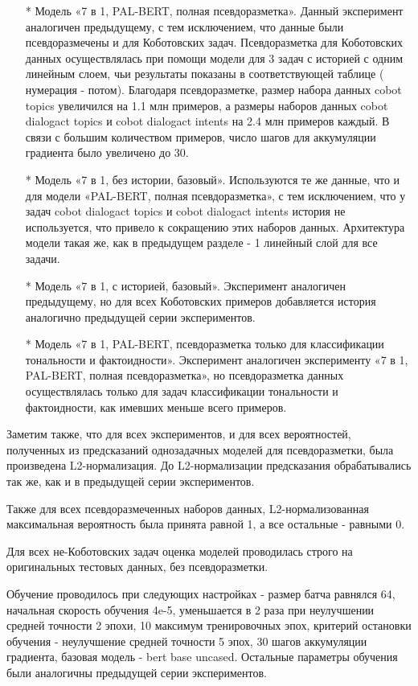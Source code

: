 \begin{itemize}
\item[*] Модель «7  в 1, PAL-BERT, полная псевдоразметка». Данный эксперимент аналогичен предыдущему, с тем исключением, что данные были псевдоразмечены и для Коботовских задач.  Псевдоразметка для Коботовских данных осуществлялась при помощи модели для 3 задач с историей с одним линейным слоем, чьи результаты показаны в соответствующей таблице ( нумерация - потом). Благодаря псевдоразметке, размер набора данных cobot topics увеличился на 1.1 млн примеров, а размеры наборов данных cobot dialogact topics и cobot dialogact intents на 2.4 млн примеров каждый. В связи с большим количеством примеров, число шагов для аккумуляции градиента было увеличено до 30.

\item[*] Модель «7 в 1, без истории, базовый». Используются те же данные, что и для модели «PAL-BERT, полная псевдоразметка», с тем исключением, что у задач cobot dialogact topics и cobot dialogact intents история не используется, что привело к сокращению этих наборов данных. Архитектура модели такая же, как в предыдущем разделе - 1 линейный слой для все задачи.

\item[*] Модель «7 в 1, с историей, базовый». Эксперимент аналогичен предыдущему, но для всех Коботовских примеров добавляется история аналогично предыдущей серии экспериментов.

\item[*] Модель «7 в 1, PAL-BERT, псевдоразметка только для классификации тональности и фактоидности». Эксперимент аналогичен эксперименту «7 в 1, PAL-BERT, полная псевдоразметка», но псевдоразметка данных осуществлялась только для задач классификации тональности и фактоидности, как имевших меньше всего примеров.

\end{itemize}
Заметим также, что для всех экспериментов, и для всех вероятностей, полученных из предсказаний однозадачных моделей для псевдоразметки, была произведена L2-нормализация. До L2-нормализации предсказания обрабатывались так же, как и в предыдущей серии экспериментов.

Также для всех псевдоразмеченных наборов данных, L2-нормализованная максимальная вероятность была принята равной 1, а все остальные - равными 0.

Для всех не-Коботовских задач оценка моделей проводилась строго на оригинальных тестовых данных, без псевдоразметки.

Обучение проводилось при следующих настройках - размер батча равнялся 64, начальная скорость обучения 4e-5, уменьшается в 2 раза при неулучшении средней точности 2 эпохи, 10 максимум тренировочных эпох, критерий остановки обучения - неулучшение средней точности 5 эпох, 30 шагов аккумуляции градиента, базовая модель - bert base uncased. Остальные параметры обучения были аналогичны предыдущей серии экспериментов.

